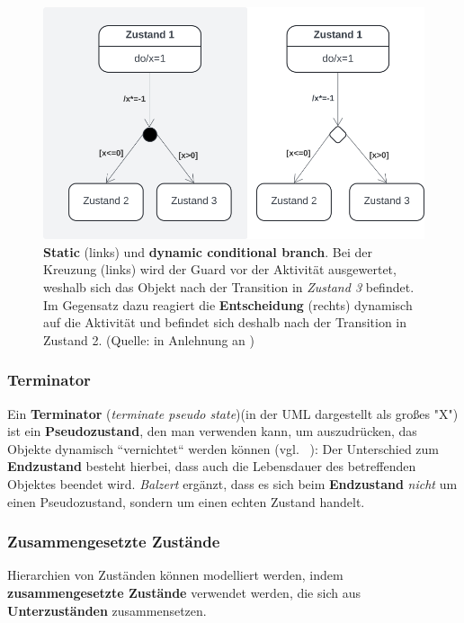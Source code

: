 \begin{figure}
    \centering
    \includegraphics[scale=0.4]{part three/Zustandsautomaten/img/kreuzungentscheidung}
    \caption{\textbf{Static} (links) und \textbf{dynamic conditional branch}. Bei der Kreuzung (links) wird der Guard vor der Aktivität ausgewertet, weshalb sich das Objekt nach der Transition in \textit{Zustand 3} befindet. Im Gegensatz dazu reagiert die \textbf{Entscheidung} (rechts) dynamisch auf die Aktivität und befindet sich deshalb nach der Transition in Zustand 2. (Quelle: in Anlehnung an \cite[72, Abb. 7.7, Abb. 7.8]{Buh09})}
    \label{fig:kreuzungentscheidung}
\end{figure}


\subsubsection*{Terminator}
Ein \textbf{Terminator} (\textit{terminate pseudo state})(in der UML dargestellt als großes "X") ist ein \textbf{Pseudozustand}, den man verwenden kann, um auszudrücken, das Objekte dynamisch ``vernichtet`` werden können (vgl. ~\cite[341]{Bal05}): Der Unterschied zum \textbf{Endzustand} besteht hierbei, dass auch die Lebensdauer des betreffenden Objektes beendet wird. \textit{Balzert} ergänzt, dass es sich beim \textbf{Endzustand} \textit{nicht} um einen Pseudozustand, sondern um einen echten Zustand handelt.

\subsubsection*{Zusammengesetzte Zustände}
Hierarchien von Zuständen können modelliert werden, indem \textbf{zusammengesetzte Zustände} verwendet werden, die sich aus \textbf{Unterzuständen} zusammensetzen.\\

